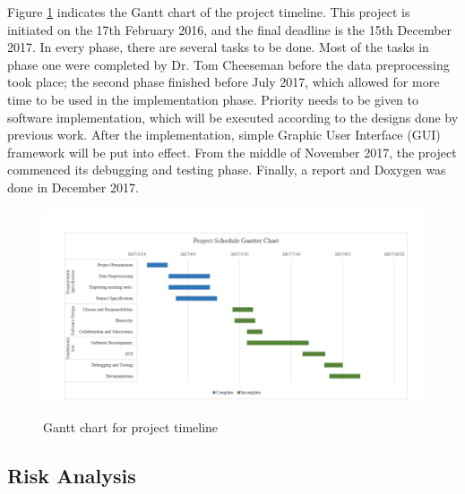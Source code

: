 Figure \ref{fig:gantterChart} indicates the Gantt chart of the project timeline. This project is initiated on the 17th February 2016, and the final deadline is the 15th December 2017. In every phase, there are several tasks to be done. Most of the tasks in phase one were completed by Dr. Tom Cheeseman before the data preprocessing took place; the second phase finished before July 2017, which allowed for more time to be used in the implementation phase. Priority needs to be given to software implementation, which will be executed according to the designs done by previous work. After the implementation, simple Graphic User Interface (GUI) framework will be put into effect. From the middle of November 2017, the project commenced its debugging and testing phase. Finally, a report and Doxygen was done in December 2017.
\begin{landscape}
	\begin{figure}[H]
		\centering    
		\includegraphics[scale=1]{Figs/Gantter-Chart}\\[1ex]
		\caption{Gantt chart for project timeline }
		\label{fig:gantterChart}
	\end{figure}
	
\end{landscape}


\subsection{Risk Analysis}



